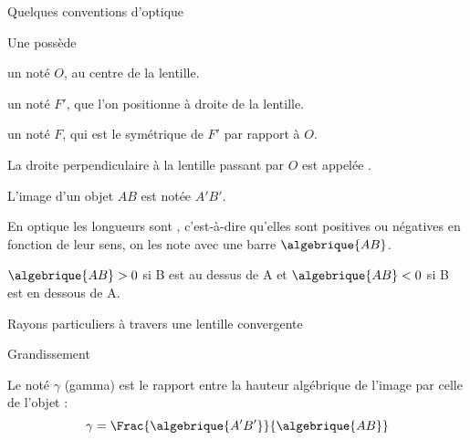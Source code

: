 \begin{doc}{Quelques conventions d'optique}
  \label{doc:convention_optique}
  \vspace{-24pt}
  \begin{encart}
    Une  possède
    \begin{listePoints}
      \item un  noté $O$, au centre de la lentille. 
      \item un  noté $F'$, que l'on positionne à droite de la lentille.
      \item un  noté $F$, qui est le symétrique de $F'$ par rapport à $O$.
    \end{listePoints}
  \end{encart}
  
  La droite perpendiculaire à la lentille passant par $O$ est appelée .
  
  L'image d'un objet $AB$ est notée $A'B'$.
  \begin{encart}
    En optique les longueurs sont , c'est-à-dire qu'elles sont positives ou négatives en fonction de leur sens, on les note avec une barre $\algebrique{AB}$.
  \end{encart}
  \exemple $\algebrique{AB} > 0$ si B est au dessus de A et $\algebrique{AB} < 0$ si B est en dessous de A.
\end{doc}

\begin{doc}{Rayons particuliers à travers une lentille convergente}
  \label{doc:rayons_lentille}
  \centering
\end{doc}

\begin{doc}{Grandissement}
  \label{doc:grandissement}
  \vspace*{-24pt}
  \begin{encart}
    Le  noté $\gamma$ (gamma) est le rapport entre la hauteur algébrique de l'image par celle de l'objet :
    \begin{equation*}
        \gamma = \Frac{\algebrique{A'B'}}{\algebrique{AB}}
    \end{equation*}
  \end{encart}
\end{doc}


